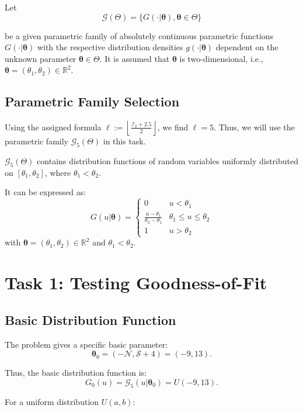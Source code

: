 \documentclass{article}
\begin{document}
Let
\[
\mathcal{G}(\Theta) = \{G(\cdot|\boldsymbol{\theta}), \boldsymbol{\theta} \in \Theta\}
\]

be a given parametric family of absolutely continuous parametric functions \(G(\cdot|\boldsymbol{\theta})\) with the respective distribution densities \(g(\cdot|\boldsymbol{\theta})\) dependent on the unknown parameter \(\boldsymbol{\theta} \in \Theta\). It is assumed that \(\boldsymbol{\theta}\) is two-dimensional, i.e., \(\boldsymbol{\theta} = (\theta_1, \theta_2) \in \mathbb{R}^2\).

\subsection{Parametric Family Selection}

Using the assigned formula \( \ell := \left\lfloor \frac{\mathcal{I}_2 + 2.5}{2} \right\rfloor \), we find \( \ell = 5 \). Thus, we will use the parametric family \(\mathcal{G}_5(\Theta)\) in this task.

$\mathcal{G}_5(\Theta)$ contains distribution functions of random variables uniformly distributed on $[\theta_1, \theta_2]$, where $\theta_1 < \theta_2$.

It can be expressed as:
\[
G(u|\boldsymbol\theta) = \begin{cases}
0 & u < \theta_1 \\
\frac{u - \theta_1}{\theta_2 - \theta_1} & \theta_1 \le u \le \theta_2 \\
1 & u > \theta_2
\end{cases}
\]
with \(\boldsymbol\theta = (\theta_1, \theta_2) \in \mathbb{R}^2\) and \(\theta_1 < \theta_2\).

\section{Task 1: Testing Goodness-of-Fit}

\subsection{Basic Distribution Function}

The problem gives a specific basic parameter:
\[
\boldsymbol\theta_0 = (-\mathcal{N}, \mathcal{S} + 4) = (-9, 13).
\]

Thus, the basic distribution function is:
\[
G_0(u) = \mathcal{G}_5(u|\boldsymbol\theta_0) = U(-9, 13).
\]

For a uniform distribution \(U(a,b)\):
\end{document}
